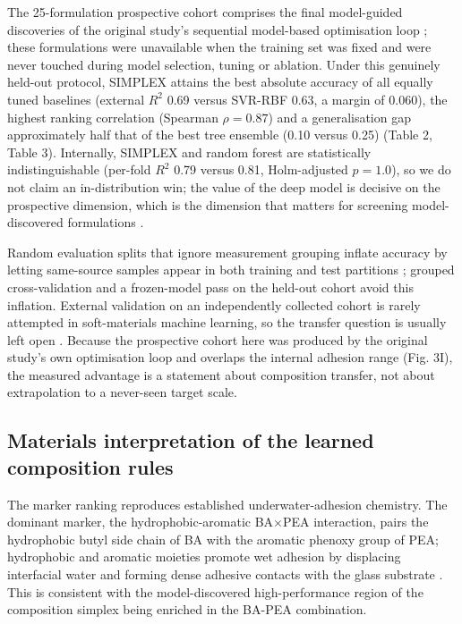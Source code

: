 \documentclass[utf8]{FrontiersinHarvard}
\begin{document}
The 25-formulation prospective cohort comprises the final model-guided discoveries of the original study's sequential model-based optimisation loop \cite{liao2025nature}; these formulations were unavailable when the training set was fixed and were never touched during model selection, tuning or ablation. Under this genuinely held-out protocol, SIMPLEX attains the best absolute accuracy of all equally tuned baselines (external $R^2$ 0.69 versus SVR-RBF 0.63, a margin of 0.060), the highest ranking correlation (Spearman $\rho = 0.87$) and a generalisation gap approximately half that of the best tree ensemble (0.10 versus 0.25) (Table 2, Table 3). Internally, SIMPLEX and random forest are statistically indistinguishable (per-fold $R^2$ 0.79 versus 0.81, Holm-adjusted $p = 1.0$), so we do not claim an in-distribution win; the value of the deep model is decisive on the prospective dimension, which is the dimension that matters for screening model-discovered formulations \cite{ovadia2019uncertainty,shen2021ood,mouret2017realitygap}.

Random evaluation splits that ignore measurement grouping inflate accuracy by letting same-source samples appear in both training and test partitions \cite{ovadia2019uncertainty,quinonero2009dataset}; grouped cross-validation and a frozen-model pass on the held-out cohort avoid this inflation. External validation on an independently collected cohort is rarely attempted in soft-materials machine learning, so the transfer question is usually left open \cite{mouret2017realitygap,shen2021ood,gulrajani2021domain}. Because the prospective cohort here was produced by the original study's own optimisation loop and overlaps the internal adhesion range (Fig. 3I), the measured advantage is a statement about composition transfer, not about extrapolation to a never-seen target scale.

\subsection{Materials interpretation of the learned composition rules}

The marker ranking reproduces established underwater-adhesion chemistry. The dominant marker, the hydrophobic-aromatic BA$\times$PEA interaction, pairs the hydrophobic butyl side chain of BA with the aromatic phenoxy group of PEA; hydrophobic and aromatic moieties promote wet adhesion by displacing interfacial water and forming dense adhesive contacts with the glass substrate \cite{cai2021bioadhesives,maier2015saltdisplacement,narayanan2021underwater,zhang2020catechol,lee2007mussel,waite2017mussel,recent2022tan,recent2021zhu,recent2024panb,recent2022yangb,recent2021ma}. This is consistent with the model-discovered high-performance region of the composition simplex being enriched in the BA-PEA combination.
\end{document}
